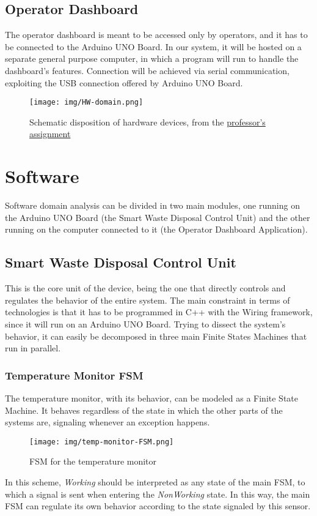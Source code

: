 \documentclass[a4paper,12pt]{report}
\begin{document}
	\subsection{Operator Dashboard}
	The operator dashboard is meant to be accessed only by operators, and it has to be connected to the Arduino UNO Board.\newline
	In our system, it will be hosted on a separate general purpose computer, in which a program will run to handle the dashboard's features. Connection will be achieved via serial communication, exploiting the USB connection offered by Arduino UNO Board.
	
	\begin{figure}[H]
		\centering{}
		\texttt{[image: img/HW-domain.png]}
		\caption{Schematic disposition of hardware devices, from the \href{https://docs.google.com/document/d/1iFXGmo7RVZMpJ5bxUN5ms_qFqg2B-wecRc0sfas9rQ4/edit?usp=sharing}{professor's assignment}}
		\label{img:hw-domain}
	\end{figure}
	
	\section{Software}
	Software domain analysis can be divided in two main modules, one running on the Arduino UNO Board (the Smart Waste Disposal Control Unit) and the other running on the computer connected to it (the Operator Dashboard Application).
	
	\subsection{Smart Waste Disposal Control Unit}
	This is the core unit of the device, being the one that directly controls and regulates the behavior of the entire system.\newline
	The main constraint in terms of technologies is that it has to be programmed in C++ with the Wiring framework, since it will run on an Arduino UNO Board. Trying to dissect the system's behavior, it can easily be decomposed in three main Finite States Machines that run in parallel.
	
	\subsubsection{Temperature Monitor FSM}
	The temperature monitor, with its behavior, can be modeled as a Finite State Machine. It behaves regardless of the state in which the other parts of the systems are, signaling whenever an exception happens.
	\begin{figure}[H]
		\centering{}
		\texttt{[image: img/temp-monitor-FSM.png]}
		\caption{FSM for the temperature monitor}
		\label{img:temp-monitor-FSM}
	\end{figure}
	In this scheme, \emph{Working} should be interpreted as any state of the main FSM, to which a signal is sent when entering the \emph{NonWorking} state. In this way, the main FSM can regulate its own behavior according to the state signaled by this sensor. 
	
\end{document}
